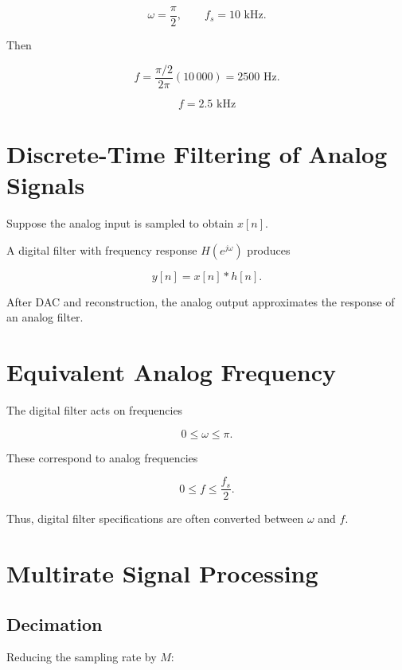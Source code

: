 \[
\omega=\frac{\pi}{2},
\qquad
f_s=10\text{ kHz}.
\]

Then

\[
f=
\frac{\pi/2}{2\pi}(10\,000)
=
2500\text{ Hz}.
\]

\[
\boxed{
f=2.5\text{ kHz}
}
\]


\section{Discrete-Time Filtering of Analog Signals}

Suppose the analog input is sampled to obtain \(x[n]\).

A digital filter with frequency response \(H(e^{j\omega})\) produces

\[
y[n]=x[n]*h[n].
\]

After DAC and reconstruction, the analog output approximates the response of an
analog filter.


\section{Equivalent Analog Frequency}

The digital filter acts on frequencies

\[
0\le\omega\le\pi.
\]

These correspond to analog frequencies

\[
0\le f\le\frac{f_s}{2}.
\]

Thus, digital filter specifications are often converted between \(\omega\) and
\(f\).


\section{Multirate Signal Processing}


\subsection{Decimation}

Reducing the sampling rate by \(M\):

